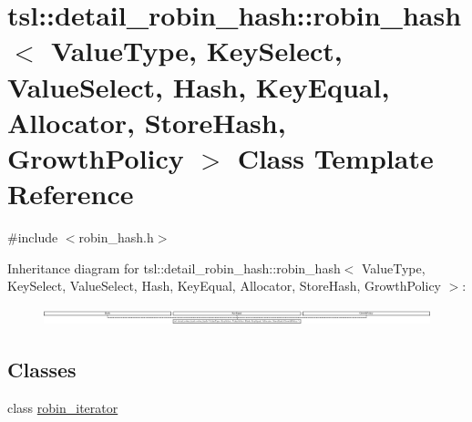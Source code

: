 \hypertarget{classtsl_1_1detail__robin__hash_1_1robin__hash}{}\section{tsl\+::detail\+\_\+robin\+\_\+hash\+::robin\+\_\+hash$<$ Value\+Type, Key\+Select, Value\+Select, Hash, Key\+Equal, Allocator, Store\+Hash, Growth\+Policy $>$ Class Template Reference}
\label{classtsl_1_1detail__robin__hash_1_1robin__hash}


{\ttfamily \#include $<$robin\+\_\+hash.\+h$>$}

Inheritance diagram for tsl\+::detail\+\_\+robin\+\_\+hash\+::robin\+\_\+hash$<$ Value\+Type, Key\+Select, Value\+Select, Hash, Key\+Equal, Allocator, Store\+Hash, Growth\+Policy $>$\+:\begin{figure}[H]
\begin{center}
\leavevmode
\includegraphics[height=0.499777cm]{classtsl_1_1detail__robin__hash_1_1robin__hash}
\end{center}
\end{figure}
\subsection*{Classes}
\begin{DoxyCompactItemize}
\item 
class \mbox{\hyperlink{classtsl_1_1detail__robin__hash_1_1robin__hash_1_1robin__iterator}{robin\+\_\+iterator}}
\end{DoxyCompactItemize}
